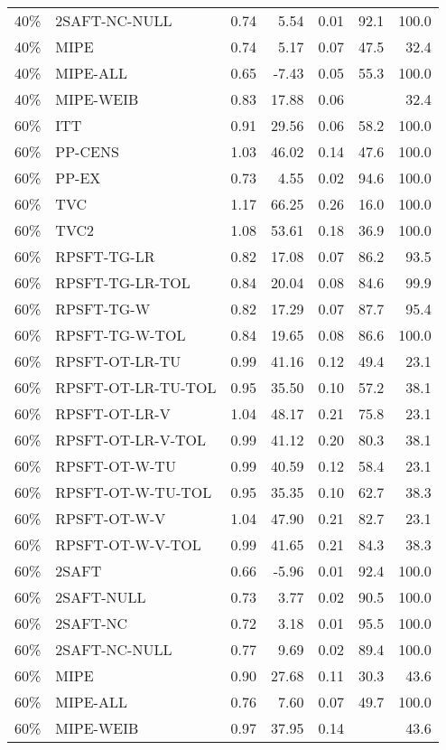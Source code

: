 \begin{table}[ht]
{\begin{tabular}{llrrrrr}
  40\% & 2SAFT-NC-NULL & 0.74 & 5.54 & 0.01 & 92.1 & 100.0 \\ 
  40\% & MIPE & 0.74 & 5.17 & 0.07 & 47.5 & 32.4 \\ 
  40\% & MIPE-ALL & 0.65 & -7.43 & 0.05 & 55.3 & 100.0 \\ 
  40\% & MIPE-WEIB & 0.83 & 17.88 & 0.06 &  & 32.4 \\ 
   \hline
60\% & ITT & 0.91 & 29.56 & 0.06 & 58.2 & 100.0 \\ 
  60\% & PP-CENS & 1.03 & 46.02 & 0.14 & 47.6 & 100.0 \\ 
  60\% & PP-EX & 0.73 & 4.55 & 0.02 & 94.6 & 100.0 \\ 
  60\% & TVC & 1.17 & 66.25 & 0.26 & 16.0 & 100.0 \\ 
  60\% & TVC2 & 1.08 & 53.61 & 0.18 & 36.9 & 100.0 \\ 
   \hline
60\% & RPSFT-TG-LR & 0.82 & 17.08 & 0.07 & 86.2 & 93.5 \\ 
  60\% & RPSFT-TG-LR-TOL & 0.84 & 20.04 & 0.08 & 84.6 & 99.9 \\ 
  60\% & RPSFT-TG-W & 0.82 & 17.29 & 0.07 & 87.7 & 95.4 \\ 
  60\% & RPSFT-TG-W-TOL & 0.84 & 19.65 & 0.08 & 86.6 & 100.0 \\ 
  60\% & RPSFT-OT-LR-TU & 0.99 & 41.16 & 0.12 & 49.4 & 23.1 \\ 
  60\% & RPSFT-OT-LR-TU-TOL & 0.95 & 35.50 & 0.10 & 57.2 & 38.1 \\ 
  60\% & RPSFT-OT-LR-V & 1.04 & 48.17 & 0.21 & 75.8 & 23.1 \\ 
  60\% & RPSFT-OT-LR-V-TOL & 0.99 & 41.12 & 0.20 & 80.3 & 38.1 \\ 
   \hline
60\% & RPSFT-OT-W-TU & 0.99 & 40.59 & 0.12 & 58.4 & 23.1 \\ 
  60\% & RPSFT-OT-W-TU-TOL & 0.95 & 35.35 & 0.10 & 62.7 & 38.3 \\ 
  60\% & RPSFT-OT-W-V & 1.04 & 47.90 & 0.21 & 82.7 & 23.1 \\ 
  60\% & RPSFT-OT-W-V-TOL & 0.99 & 41.65 & 0.21 & 84.3 & 38.3 \\ 
   \hline
60\% & 2SAFT & 0.66 & -5.96 & 0.01 & 92.4 & 100.0 \\ 
  60\% & 2SAFT-NULL & 0.73 & 3.77 & 0.02 & 90.5 & 100.0 \\ 
  60\% & 2SAFT-NC & 0.72 & 3.18 & 0.01 & 95.5 & 100.0 \\ 
  60\% & 2SAFT-NC-NULL & 0.77 & 9.69 & 0.02 & 89.4 & 100.0 \\ 
  60\% & MIPE & 0.90 & 27.68 & 0.11 & 30.3 & 43.6 \\ 
  60\% & MIPE-ALL & 0.76 & 7.60 & 0.07 & 49.7 & 100.0 \\ 
  60\% & MIPE-WEIB & 0.97 & 37.95 & 0.14 &  & 43.6 \\ 
   \hline
\end{tabular}
}
\end{table}
